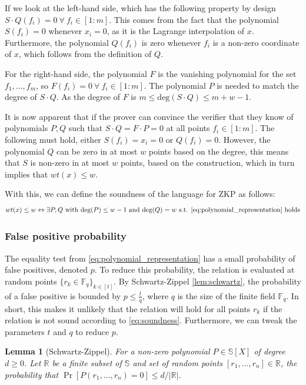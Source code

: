 \documentclass[11pt]{report}
\theoremstyle{definition}
\theoremstyle{plain}
\newtheorem{lemma}{Lemma}[section]
\begin{document}
If we look at the left-hand side, which has the following property by design $S\cdot Q(f_i) = 0 \ \forall\ f_i \in [1:m]$. This comes from the fact that the polynomial $S(f_i) = 0$ whenever $x_i = 0$, as it is the Lagrange interpolation of $x$. Furthermore, the polynomial $Q(f_i)$ is zero whenever $f_i$ is a non-zero coordinate of $x$, which follows from the definition of $Q$.

For the right-hand side, the polynomial $F$ is the vanishing polynomial for the set ${f_1, \dots, f_m}$, so $F(f_i) = 0\ \forall\ f_i \in [1:m]$. The polynomial $P$ is needed to match the degree of $S \cdot Q$. As the degree of $F$ is $m \leq \text{deg}(S\cdot Q) \leq m + w - 1$.

It is now apparent that if the prover can convince the verifier that they know of polynomials $P,Q$ such that $S\cdot Q = F \cdot P = 0$ at all points $f_i \in [1:m]$. The following must hold, either $S(f_i) = x_i = 0$ or $Q(f_i) = 0$. However, the polynomial $Q$ can be zero in at most $w$ points based on the degree, this means that $S$ is non-zero in at most $w$ points, based on the construction, which in turn implies that $wt(x) \leq w$.

With this, we can define the soundness of the language for ZKP as follows:
\begin{equation}
  wt(x) \leq w \Leftrightarrow \exists P,Q \text{  with  }\text{deg}(P)\leq w-1\text{  and  }\text{deg}(Q) = w\text{ s.t. \autoref{eq:polynomial_representation} holds}\label{eq:soundness}
\end{equation}

\subsubsection{False positive probability}\label{sub:equality_test}
The equality test from \autoref{eq:polynomial_representation} has a small probability of false positives, denoted $p$. To reduce this probability, the relation is evaluated at random points $\{r_k \in \mathbb{F}_q\}_{k\in[t]}$. By Schwartz-Zippel \autoref{lem:schwartz}, the probability of a false positive is bounded by $p \leq \frac{t}{q}$, where $q$ is the size of the finite field $\mathbb{F}_q$. In short, this makes it unlikely that the relation will hold for all points $r_k$ if the relation is not sound according to \autoref{eq:soundness}. Furthermore, we can tweak the parameters $t$ and $q$ to reduce $p$.

\begin{lemma}[Schwartz-Zippel]\label{lem:schwartz}
  For a non-zero polynomial $P \in \mathbb{S}[X]$ of degree $d \geq 0$. Let $\mathbb{R}$ be a finite subset of $\mathbb{S}$ and set of random points $[r_1, \dots, r_n] \in \mathbb{R}$, the probability that $\Pr[P(r_1, \dots, r_n) = 0] \leq d/|\mathbb{R}|$.
\end{lemma}
\end{document}
